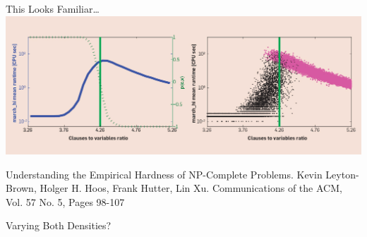 \documentclass{beamer}
\begin{document}
\begin{frame}{This Looks Familiar\ldots}
    \centering
    \includegraphics*[keepaspectratio=true,scale=0.25]{sat.jpg}

    \par\flushleft
    Understanding the Empirical Hardness of NP-Complete Problems. Kevin Leyton-Brown, Holger H.
    Hoos, Frank Hutter, Lin Xu.  Communications of the ACM, Vol. 57 No. 5, Pages 98-107
\end{frame}

\begin{frame}{Varying Both Densities?}
     {
        
    }

     {
        
    }

     {
        
    }
\end{frame}
\end{document}
